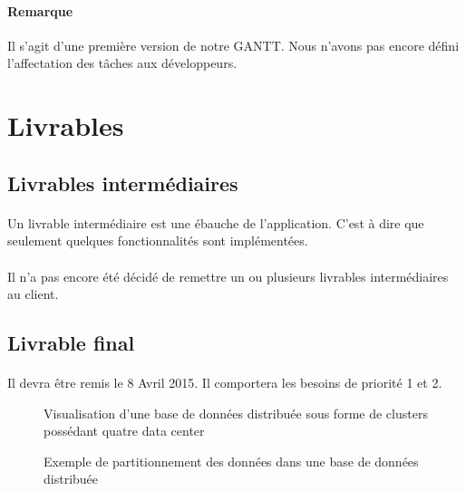 \documentclass[12pt]{article}
\begin{document}
 \vspace{1cm}
 
\paragraph{Remarque} Il s'agit d'une première version de notre GANTT. Nous n'avons pas encore défini l'affectation des tâches aux développeurs.


\newpage

\section{Livrables}

\subsection{Livrables intermédiaires}

\paragraph{} Un livrable intermédiaire est une ébauche de l'application. C'est à dire que seulement quelques fonctionnalités sont implémentées.

\paragraph{} Il n'a pas encore été décidé de remettre un ou plusieurs livrables intermédiaires au client.

\subsection{Livrable final}

\paragraph{} Il devra être remis le 8 Avril 2015. Il comportera les besoins de priorité 1 et 2.



\begin{figure}[p]
	\centering
		
	\caption{Visualisation d'une base de données distribuée sous forme de clusters possédant quatre data center\label{fig:distributed_database}}
\end{figure}

\begin{figure}[p]
	\centering
		
	\caption{Exemple de partitionnement des données dans une base de données distribuée\label{fig:partitionning}}
\end{figure}
\end{document}

